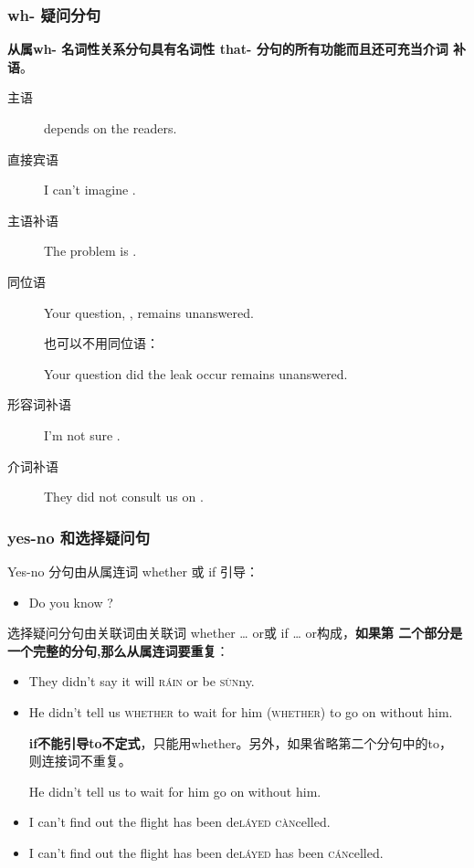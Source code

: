 \subsubsection{wh- 疑问分句}


\textbf{从属wh- 名词性关系分句具有名词性 that- 分句的所有功能而且还可充当介词
  补语}。

\begin{description}
\item[主语]  depends on the readers.

\item[直接宾语] I can't imagine .

\item[主语补语] The problem is .

\item[同位语] Your question, , remains unanswered.

  也可以不用同位语：

  Your question  did the leak occur remains unanswered.

\item[形容词补语] I'm not sure .

\item[介词补语] They did not consult us on .
\end{description}

\subsubsection{yes-no 和选择疑问句}

Yes-no 分句由从属连词 whether 或 if 引导：
\begin{itemize}
\item Do you know ?
\end{itemize}

选择疑问分句由关联词由关联词 whether \ldots{} or或 if \ldots{} or构成，\textbf{如果第
二个部分是一个完整的分句,那么从属连词要重复}：
\begin{itemize}
\item They didn't say  it will \textsc{r\'ain} or be \textsc{s\`un}ny.
\item He didn't tell us \textsc{whether} to wait for him 
  \textsc{(whether)} to go on without him.

  \textbf{if不能引导to不定式}，只能用whether。另外，如果省略第二个分句中的to，
  则连接词不重复。

  He didn't tell us  to wait for him  go on without him.

\item I can't find out  the flight has been de\textsc{l\'ayed}
   \textsc{c\`an}celled.

\item I can't find out  the flight has been de\textsc{l\'ayed} 
   has been \textsc{c\'an}celled.

\end{itemize}

